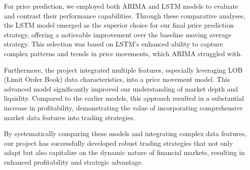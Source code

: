 \documentclass[conference]{IEEEtran}
\begin{document}
For price prediction, we employed both ARIMA and LSTM models to evaluate and contrast their performance capabilities. Through these comparative analyses, the LSTM model emerged as the superior choice for our final price prediction strategy, offering a noticeable improvement over the baseline moving average strategy. This selection was based on LSTM's enhanced ability to capture complex patterns and trends in price movements, which ARIMA struggled with.

Furthermore, the project integrated multiple features, especially leveraging LOB (Limit Order Book) data characteristics, into a price movement model. This advanced model significantly improved our understanding of market depth and liquidity. Compared to the earlier models, this approach resulted in a substantial increase in profitability, demonstrating the value of incorporating comprehensive market data features into trading strategies.

By systematically comparing these models and integrating complex data features, our project has successfully developed robust trading strategies that not only adapt but also capitalize on the dynamic nature of financial markets, resulting in enhanced profitability and strategic advantage.
\end{document}
